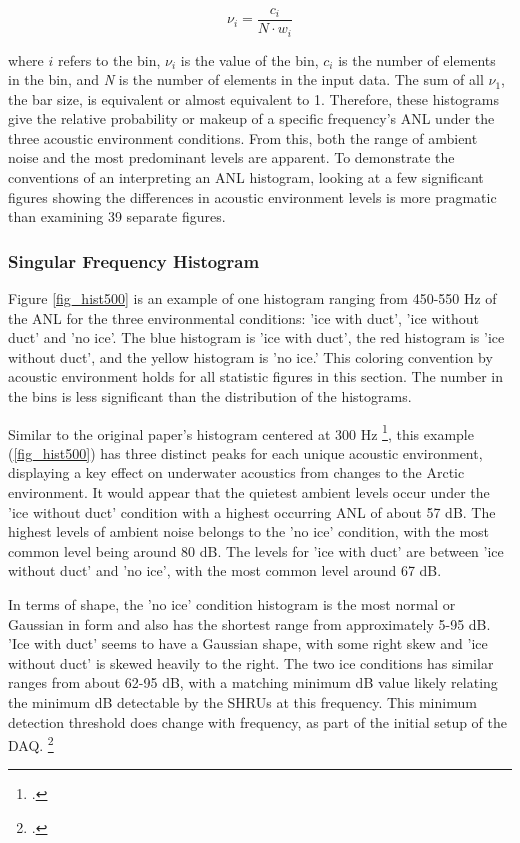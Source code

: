 \begin{equation} \label{eq:hist_pdf}
 \nu _{i}=\frac{c_{i}}{N \cdot w_{i}} 
\end{equation}

where $i$ refers to the bin, $\nu _{i}$ is the value of the bin, $c_{i}$ is the number of elements in the bin, and \textit{N} is the number of elements in the input data. The sum of all $\nu_{1}$, the bar size, is equivalent or almost equivalent to 1. Therefore, these histograms give the relative probability or makeup of a specific frequency's ANL under the three acoustic environment conditions. From this, both the range of ambient noise and the most predominant levels are apparent. To demonstrate the conventions of an interpreting an ANL histogram, looking at a few significant figures showing the differences in acoustic environment levels is more pragmatic than examining 39 separate figures.

\subsubsection{Singular Frequency Histogram}
Figure \ref{fig_hist500} is an example of one histogram ranging from 450-550 Hz of the ANL for the three environmental conditions: 'ice with duct',  'ice without duct' and 'no ice'.  The blue histogram is 'ice with duct', the red histogram is 'ice without duct', and the yellow histogram is 'no ice.'  This coloring convention by acoustic environment holds for all statistic figures in this section. The number in the bins is less significant than the distribution of the histograms. 

Similar to the original paper's histogram centered at 300 Hz \footcite[]{Bonnel2021}, this example (\autoref{fig_hist500}) has three distinct peaks for each unique acoustic environment, displaying a key effect on underwater acoustics from changes to the Arctic environment.  It would appear that the quietest ambient levels occur under the 'ice without duct' condition with a highest occurring ANL of about 57 dB. The highest levels of ambient noise belongs to  the 'no ice' condition, with the most common level being around 80 dB. The levels for 'ice with duct' are between 'ice without duct' and 'no ice', with the most common level around 67 dB. 

In terms of shape, the 'no ice' condition histogram is the most normal or Gaussian in form and also has the shortest range from approximately 5-95 dB. 'Ice with duct' seems to have a Gaussian shape, with some right skew and 'ice without duct' is skewed heavily to the right. The two ice conditions has similar ranges from about 62-95 dB, with a matching minimum dB value likely relating the minimum dB detectable by the SHRUs at this frequency. This minimum detection threshold does change with frequency, as part of the initial setup of the DAQ. \footcite{DAQprocess} %


